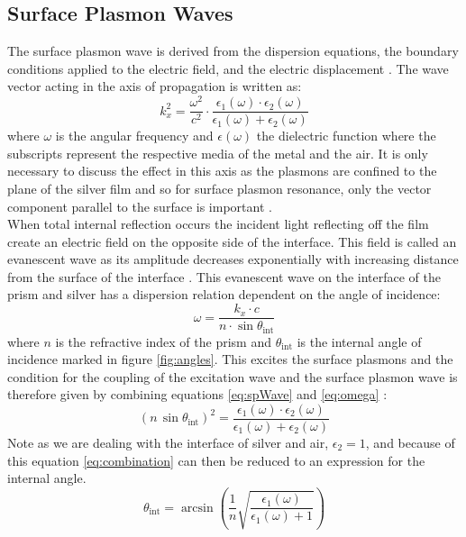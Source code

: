 \documentclass[%
reprint,
amsmath,amssymb,
aps,
]{revtex4-2}
\begin{document}
		
		\subsection{Surface Plasmon Waves}
			
			The surface plasmon wave is derived from the dispersion equations, the boundary conditions applied to the electric field, and the electric displacement \cite{pluchery}. The wave vector acting in the axis of propagation is written as:
			\begin{equation}
				k_x^2 = \frac{\omega^2}{c^2} \cdot \frac{\epsilon_1(\omega) \cdot \epsilon_2(\omega)}{\epsilon_1(\omega) + \epsilon_2(\omega)}
				\label{eq:spWave}
			\end{equation}where $\omega$ is the angular frequency and $\epsilon(\omega)$ the dielectric function where the subscripts represent the respective media of the metal and the air. It is only necessary to discuss the effect in this axis as the plasmons are confined to the plane of the silver film and so for surface plasmon resonance, only the vector component parallel to the surface is important \cite{sprTheory}.\\
		
			When total internal reflection occurs the incident light reflecting off the film create an electric field on the opposite side of the interface. This field is called an evanescent wave as its amplitude decreases exponentially with increasing distance from the surface of the interface \cite{sprTheory}. This evanescent wave on the interface of the prism and silver has a dispersion relation dependent on the angle of incidence:
			\begin{equation}
				\omega = \frac{k_x \cdot c}{n \cdot \sin{\theta_\text{int}}}
				\label{eq:omega}
			\end{equation}where $n$ is the refractive index of the prism and $\theta_\text{int}$ is the internal angle of incidence marked in figure \ref{fig:angles}. This excites the surface plasmons and the condition for the coupling of the excitation wave and the surface plasmon wave is therefore given by combining equations \ref{eq:spWave} and \ref{eq:omega} \cite{pluchery}:
			\begin{equation}
				\left(n \, \sin{\theta_\text{int}}\right)^2 = \frac{\epsilon_1(\omega) \cdot \epsilon_2(\omega)}{\epsilon_1(\omega) + \epsilon_2(\omega)}
				\label{eq:combination}
			\end{equation}Note as we are dealing with the interface of silver and air, $\epsilon_2=1$, and because of this equation \ref{eq:combination} can then be reduced to an expression for the internal angle.\\
			\begin{equation}
				\theta_\text{int} = \arcsin\left(\frac{1}{n} \sqrt{\frac{\epsilon_1(\omega)}{\epsilon_1(\omega) + 1}}\right)
				\label{eq:angle}
			\end{equation}
			
\end{document}
